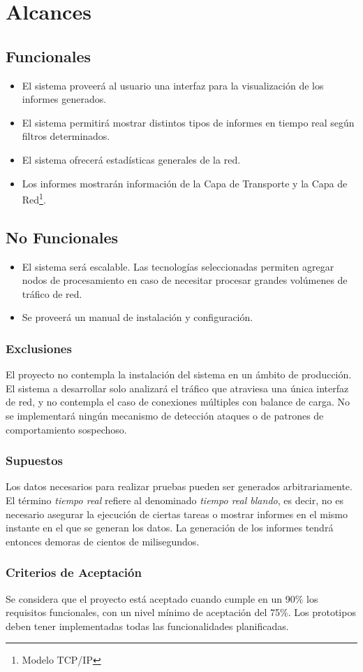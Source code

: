 \section*{Alcances}

\subsection*{Funcionales}
\begin{itemize}
	\item El sistema proveerá al usuario una interfaz para la visualización de los informes generados.
	\item El sistema permitirá mostrar distintos tipos de informes en tiempo real según filtros determinados.
	\item El sistema ofrecerá estadísticas generales de la red.
	\item Los informes mostrarán información de la Capa de Transporte y la Capa de Red\footnote{Modelo TCP/IP}.\cite{rfc791}\cite{rfc793}\cite{rfc1180}
\end{itemize}

\subsection*{No Funcionales}
\begin{itemize}
	\item El sistema será escalable. Las tecnologías seleccionadas permiten agregar nodos de procesamiento en caso de necesitar procesar grandes volúmenes de tráfico de red.
	\item Se proveerá un manual de instalación y configuración.
\end{itemize}

\subsubsection{Exclusiones}
El proyecto no contempla la instalación del sistema en un ámbito de producción.
El sistema a desarrollar solo analizará el tráfico que atraviesa una única interfaz de red, y no contempla el caso de conexiones múltiples con balance de carga.
No se implementará ningún mecanismo de detección ataques o de patrones de comportamiento sospechoso.

\subsubsection{Supuestos}
Los datos necesarios para realizar pruebas pueden ser generados arbitrariamente.
El término \textit{tiempo real} refiere al denominado \textit{tiempo real blando}, es decir, no es necesario asegurar la ejecución de ciertas tareas o mostrar informes en el mismo instante en el que se generan los datos. La generación de los informes tendrá entonces demoras de cientos de milisegundos.

\subsubsection{Criterios de Aceptación}
Se considera que el proyecto está aceptado cuando cumple en un 90\% los requisitos funcionales, con un nivel mínimo de aceptación del 75\%. Los prototipos deben tener implementadas todas las funcionalidades planificadas.

